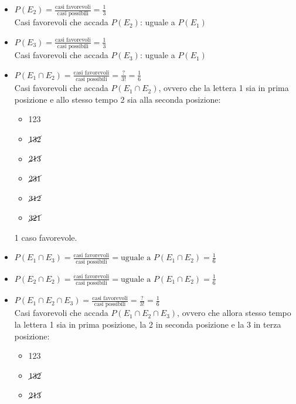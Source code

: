 \documentclass{article}  %
\theoremstyle{definition}
\begin{document}
\begin{esercizio}[Esercizio]
\begin{itemize}
\begin{itemize}
			      \item $\cancel{231}$
			      \item $\cancel{312}$
			      \item $\cancel{321}$
		      \end{itemize}
		      2 casi favorevoli.
		\item $P(E_2)=\frac{\text{casi favorevoli}}{\text{casi possibili}}=\frac{1}{3}$ \\
		      Casi favorevoli che accada $P(E_2)$: uguale a $P(E_1)$
		\item $P(E_3)=\frac{\text{casi favorevoli}}{\text{casi possibili}}=\frac{1}{3}$ \\
		      Casi favorevoli che accada $P(E_3)$: uguale a $P(E_1)$
		\item $P(E_1 \cap E_2)=\frac{\text{casi favorevoli}}{\text{casi possibili}}=\frac{?}{3!}=\frac{1}{6}$ \\
		      Casi favorevoli che accada $P(E_1 \cap E_2)$, ovvero che la lettera 1 sia in prima posizione e allo stesso tempo 2 sia alla seconda posizione:
		      \begin{itemize}
			      \item 123
			      \item $\cancel{132}$
			      \item $\cancel{213}$
			      \item $\cancel{231}$
			      \item $\cancel{312}$
			      \item $\cancel{321}$
		      \end{itemize}
		      1 caso favorevole.
		\item $P(E_1 \cap E_3)=\frac{\text{casi favorevoli}}{\text{casi possibili}}=\text{uguale a }P(E_1 \cap E_2)=\frac{1}{6}$
		\item $P(E_2 \cap E_2)=\frac{\text{casi favorevoli}}{\text{casi possibili}}=\text{uguale a }P(E_1 \cap E_2)=\frac{1}{6}$
		\item $P(E_1 \cap E_2 \cap E_3)=\frac{\text{casi favorevoli}}{\text{casi possibili}}=\frac{?}{3!}=\frac{1}{6}$ \\
		      Casi favorevoli che accada $P(E_1 \cap E_2 \cap E_3)$, ovvero che allora stesso tempo la lettera 1 sia in prima posizione, la 2 in seconda posizione e la 3 in terza posizione:
		      \begin{itemize}
			      \item 123
			      \item $\cancel{132}$
			      \item $\cancel{213}$

\end{itemize}
\end{itemize}
\end{esercizio}
\end{document}
